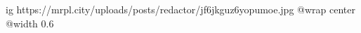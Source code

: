  
 
 
 
 

\ifcmt
  ig https://mrpl.city/uploads/posts/redactor/jf6jkguz6yopumoe.jpg
  @wrap center
  @width 0.6
\fi
